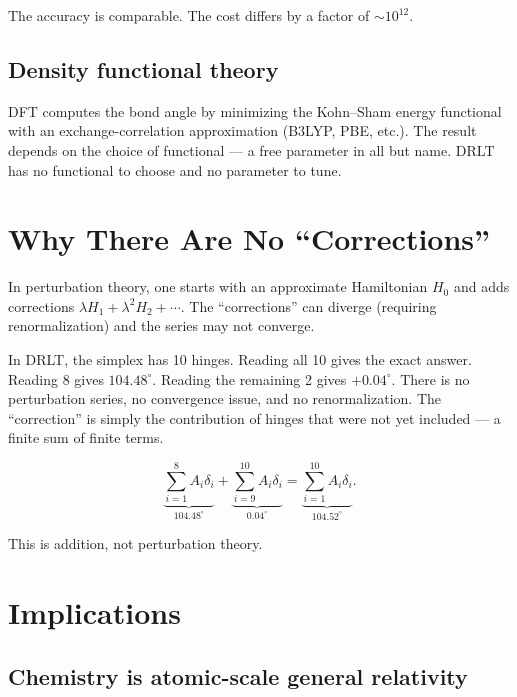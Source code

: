 \documentclass[12pt]{article}
\theoremstyle{remark}
\begin{document}
The accuracy is comparable. The cost differs by a factor of $\sim 10^{12}$.

\subsection{Density functional theory}

DFT computes the bond angle by minimizing the Kohn--Sham energy functional with an exchange-correlation approximation (B3LYP, PBE, etc.). The result depends on the choice of functional --- a free parameter in all but name. DRLT has no functional to choose and no parameter to tune.

\section{Why There Are No ``Corrections''}

In perturbation theory, one starts with an approximate Hamiltonian $H_0$ and adds corrections $\lambda H_1 + \lambda^2 H_2 + \cdots$. The ``corrections'' can diverge (requiring renormalization) and the series may not converge.

In DRLT, the simplex has 10 hinges. Reading all 10 gives the exact answer. Reading 8 gives $104.48^\circ$. Reading the remaining 2 gives $+0.04^\circ$. There is no perturbation series, no convergence issue, and no renormalization. The ``correction'' is simply the contribution of hinges that were not yet included --- a finite sum of finite terms.

\begin{equation}
\underbrace{\sum_{i=1}^{8} A_i \delta_i}_{104.48^\circ} + \underbrace{\sum_{i=9}^{10} A_i \delta_i}_{0.04^\circ} = \underbrace{\sum_{i=1}^{10} A_i \delta_i}_{104.52^\circ}.
\end{equation}

This is addition, not perturbation theory.

\section{Implications}

\subsection{Chemistry is atomic-scale general relativity}
\end{document}
